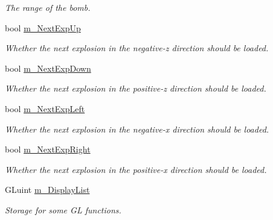 \begin{DoxyCompactItemize}
\begin{DoxyCompactList}\small\item\em The range of the bomb. \end{DoxyCompactList}\item 
\hypertarget{classBomb_ac33a0499ca26f44597730807296e7688}{bool \hyperlink{classBomb_ac33a0499ca26f44597730807296e7688}{m\-\_\-\-Next\-Exp\-Up}}\label{classBomb_ac33a0499ca26f44597730807296e7688}

\begin{DoxyCompactList}\small\item\em Whether the next explosion in the negative-\/z direction should be loaded. \end{DoxyCompactList}\item 
\hypertarget{classBomb_a838eb194c3be600b5eeb6228b52163a0}{bool \hyperlink{classBomb_a838eb194c3be600b5eeb6228b52163a0}{m\-\_\-\-Next\-Exp\-Down}}\label{classBomb_a838eb194c3be600b5eeb6228b52163a0}

\begin{DoxyCompactList}\small\item\em Whether the next explosion in the positive-\/z direction should be loaded. \end{DoxyCompactList}\item 
\hypertarget{classBomb_a4a1e8f29aedeab04a15ef024b17f7ffa}{bool \hyperlink{classBomb_a4a1e8f29aedeab04a15ef024b17f7ffa}{m\-\_\-\-Next\-Exp\-Left}}\label{classBomb_a4a1e8f29aedeab04a15ef024b17f7ffa}

\begin{DoxyCompactList}\small\item\em Whether the next explosion in the negative-\/x direction should be loaded. \end{DoxyCompactList}\item 
\hypertarget{classBomb_a4ef713c3e760f56d97e9711443d99cb4}{bool \hyperlink{classBomb_a4ef713c3e760f56d97e9711443d99cb4}{m\-\_\-\-Next\-Exp\-Right}}\label{classBomb_a4ef713c3e760f56d97e9711443d99cb4}

\begin{DoxyCompactList}\small\item\em Whether the next explosion in the positive-\/x direction should be loaded. \end{DoxyCompactList}\item 
\hypertarget{classBomb_a8d00db0491da8e1521c359693213fbd5}{G\-Luint \hyperlink{classBomb_a8d00db0491da8e1521c359693213fbd5}{m\-\_\-\-Display\-List}}\label{classBomb_a8d00db0491da8e1521c359693213fbd5}

\begin{DoxyCompactList}\small\item\em Storage for some G\-L functions. \end{DoxyCompactList}\end{DoxyCompactItemize}
